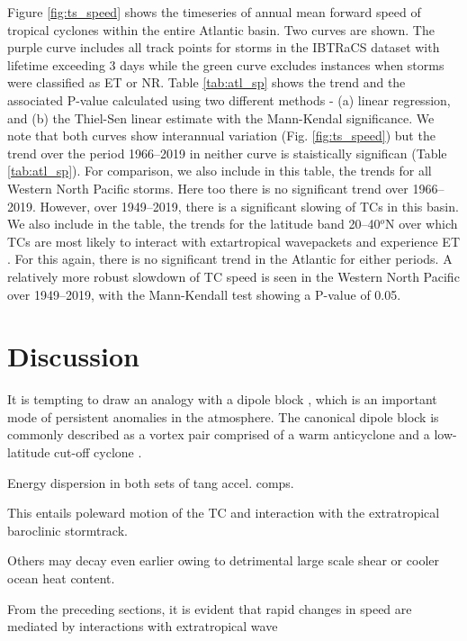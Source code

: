 \documentclass[wcd,manuscript]{copernicus}
\begin{document}
Figure \ref{fig:ts_speed} shows the timeseries of annual mean forward speed of tropical cyclones within the entire Atlantic basin. Two curves are shown. The purple curve includes all track points for storms in the IBTRaCS dataset with lifetime exceeding 3 days while the green curve excludes instances when storms were classified as ET or NR. Table \ref{tab:atl_sp} shows the trend and the associated P-value calculated using two different methods - (a) linear regression, and (b) the Thiel-Sen linear estimate with the Mann-Kendal significance. We note that both curves show interannual variation (Fig. \ref{fig:ts_speed}) but the trend over the period 1966--2019 in neither curve is staistically significan (Table \ref{tab:atl_sp}). For comparison, we also include in this table, the trends for all Western North Pacific storms. Here too there is no significant trend over 1966--2019. However, over 1949--2019, there is a significant slowing of TCs in this basin. We also include in the table, the trends for the latitude band 20--40$^o$N over which TCs are most likely to interact with extartropical wavepackets and experience ET \citep[e.g.][]{HE2001}. For this again, there is no significant trend in the Atlantic for either periods. A relatively more robust slowdown of TC speed is seen in the Western North Pacific over  1949--2019, with the Mann-Kendall test showing a P-value of 0.05.




\section{Discussion}
It is tempting to draw an analogy with a dipole block \citep[e.g.,][]{MCW1980,PH2003}, which is an important mode of persistent anomalies in the atmosphere. The canonical dipole block is commonly described as a vortex pair comprised of a warm anticyclone and a low-latitude cut-off cyclone \citep[e.g.,][]{MBDAGE2006}. 

Energy dispersion in both sets of tang accel. comps.

 This entails poleward motion of the TC and interaction with the extratropical baroclinic stormtrack.

Others may decay even earlier owing to detrimental large scale shear or cooler ocean heat content. 


From the preceding sections, it is evident that rapid changes in speed are mediated by interactions with extratropical wave
\end{document}
